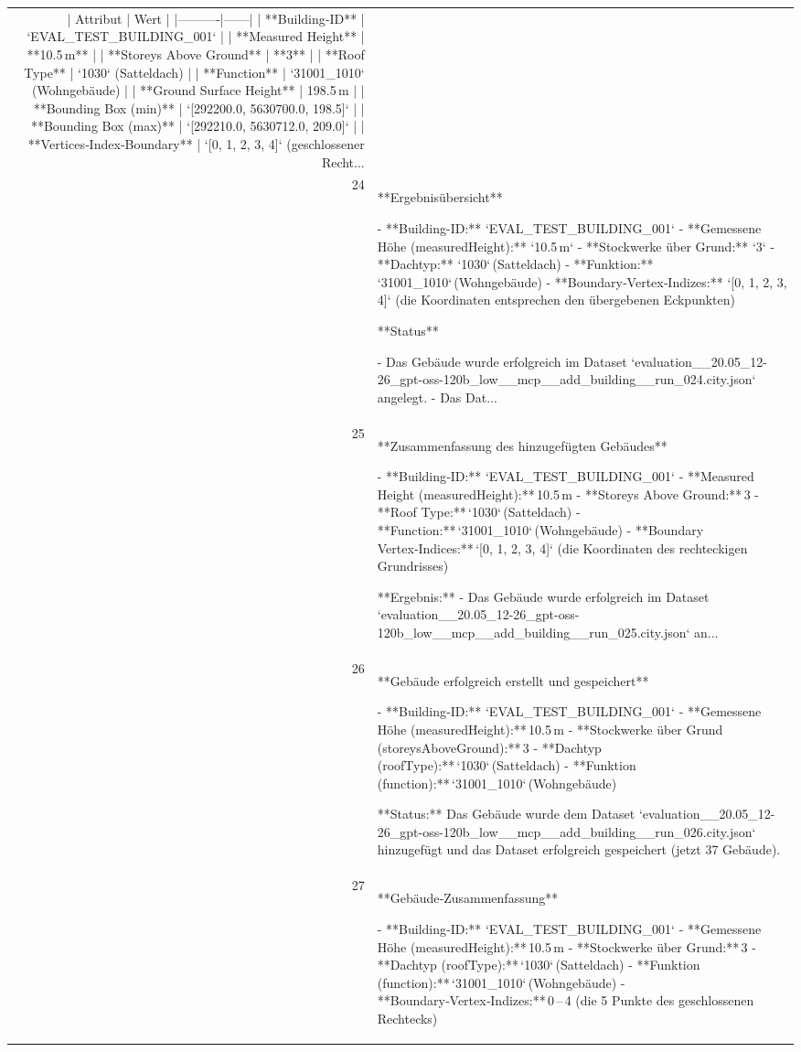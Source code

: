 \documentclass[a4paper,11pt]{article}
\begin{document}
\begin{table}[ht]
\begin{tabular}{r p{12cm}}
| Attribut | Wert |
|----------|------|
| **Building‑ID** | `EVAL\_TEST\_BUILDING\_001` |
| **Measured Height** | **10.5 m** |
| **Storeys Above Ground** | **3** |
| **Roof Type** | `1030` (Satteldach) |
| **Function** | `31001\_1010` (Wohngebäude) |
| **Ground Surface Height** | 198.5 m |
| **Bounding Box (min)** | `[292200.0, 5630700.0, 198.5]` |
| **Bounding Box (max)** | `[292210.0, 5630712.0, 209.0]` |
| **Vertices‑Index‑Boundary** | `[0, 1, 2, 3, 4]` (geschlossener Recht... \\
24 & **Ergebnisübersicht**

- **Building-ID:** `EVAL\_TEST\_BUILDING\_001`  
- **Gemessene Höhe (measuredHeight):** `10.5 m`  
- **Stockwerke über Grund:** `3`  
- **Dachtyp:** `1030` (Satteldach)  
- **Funktion:** `31001\_1010` (Wohngebäude)  
- **Boundary‑Vertex‑Indizes:** `[0, 1, 2, 3, 4]` (die Koordinaten entsprechen den übergebenen Eckpunkten)

**Status**

- Das Gebäude wurde erfolgreich im Dataset `evaluation\_\_20.05\_12-26\_gpt-oss-120b\_low\_\_mcp\_\_add\_building\_\_run\_024.city.json` angelegt.  
- Das Dat... \\
25 & **Zusammenfassung des hinzugefügten Gebäudes**

- **Building‑ID:** `EVAL\_TEST\_BUILDING\_001`  
- **Measured Height (measuredHeight):** 10.5 m  
- **Storeys Above Ground:** 3  
- **Roof Type:** `1030` (Satteldach)  
- **Function:** `31001\_1010` (Wohngebäude)  
- **Boundary Vertex‑Indices:** `[0, 1, 2, 3, 4]` (die Koordinaten des rechteckigen Grundrisses)  

**Ergebnis:**  
- Das Gebäude wurde erfolgreich im Dataset `evaluation\_\_20.05\_12-26\_gpt-oss-120b\_low\_\_mcp\_\_add\_building\_\_run\_025.city.json` an... \\
26 & **Gebäude erfolgreich erstellt und gespeichert**

- **Building‑ID:** `EVAL\_TEST\_BUILDING\_001`  
- **Gemessene Höhe (measuredHeight):** 10.5 m  
- **Stockwerke über Grund (storeysAboveGround):** 3  
- **Dachtyp (roofType):** `1030` (Satteldach)  
- **Funktion (function):** `31001\_1010` (Wohngebäude)  

**Status:** Das Gebäude wurde dem Dataset `evaluation\_\_20.05\_12-26\_gpt-oss-120b\_low\_\_mcp\_\_add\_building\_\_run\_026.city.json` hinzugefügt und das Dataset erfolgreich gespeichert (jetzt 37 Gebäude). \\
27 & **Gebäude‑Zusammenfassung**

- **Building‑ID:** `EVAL\_TEST\_BUILDING\_001`  
- **Gemessene Höhe (measuredHeight):** 10.5 m  
- **Stockwerke über Grund:** 3  
- **Dachtyp (roofType):** `1030` (Satteldach)  
- **Funktion (function):** `31001\_1010` (Wohngebäude)  
- **Boundary‑Vertex‑Indizes:** 0 – 4 (die 5 Punkte des geschlossenen Rechtecks)


\end{tabular}
\end{table}
\end{document}
